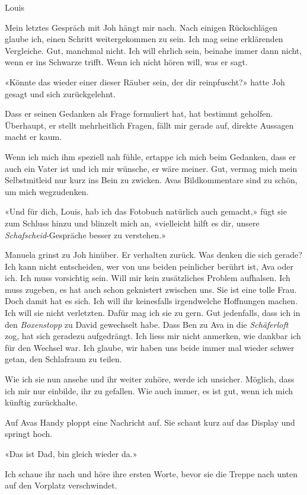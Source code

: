 Louis

Mein letztes Gespräch mit Joh hängt mir nach. Nach einigen Rückschlägen
glaube ich, einen Schritt weitergekommen zu sein. Ich mag seine
erklärenden Vergleiche. Gut, manchmal nicht. Ich will ehrlich sein,
beinahe immer dann nicht, wenn er ins Schwarze trifft. Wenn ich nicht
hören will, was er sagt.

«Könnte das wieder einer dieser Räuber sein, der dir reinpfuscht?» hatte
Joh gesagt und sich zurückgelehnt.

Dass er seinen Gedanken als Frage formuliert hat, hat bestimmt geholfen.
Überhaupt, er stellt mehrheitlich Fragen, fällt mir gerade auf, direkte
Aussagen macht er kaum.

Wenn ich mich ihm speziell nah fühle, ertappe ich mich beim Gedanken,
dass er auch ein Vater ist und ich mir wünsche, er wäre meiner. Gut,
vermag mich mein Selbstmitleid nur kurz ins Bein zu zwicken. Avas
Bildkommentare sind zu schön, um mich wegzudenken.

«Und für dich, Louis, hab ich das Fotobuch natürlich auch gemacht,» fügt
sie zum Schluss hinzu und blinzelt mich an, «vielleicht hilft es dir,
unsere \emph{Schafscheid}-Gespräche besser zu verstehen.»

Manuela grinst zu Joh hinüber. Er verhalten zurück. Was denken die sich
gerade? Ich kann nicht entscheiden, wer von uns beiden peinlicher
berührt ist, Ava oder ich. Ich muss vorsichtig sein. Will mir kein
zusätzliches Problem aufhalsen. Ich muss zugeben, es hat auch schon
geknistert zwischen uns. Sie ist eine tolle Frau. Doch damit hat es
sich. Ich will ihr keinesfalls irgendwelche Hoffnungen machen. Ich will
sie nicht verletzten. Dafür mag ich sie zu gern. Gut jedenfalls, dass
ich in den \emph{Boxenstopp} zu David gewechselt habe. Dass Ben zu Ava
in die \emph{Schäferloft} zog, hat sich geradezu aufgedrängt. Ich liess
mir nicht anmerken, wie dankbar ich für den Wechsel war. Ich glaube, wir
haben uns beide immer mal wieder schwer getan, den Schlafraum zu teilen.

Wie ich sie nun ansehe und ihr weiter zuhöre, werde ich unsicher.
Möglich, dass ich mir nur einbilde, ihr zu gefallen. Wie auch immer, es
ist gut, wenn ich mich künftig zurückhalte.

Auf Avas Handy ploppt eine Nachricht auf. Sie schaut kurz auf das
Display und springt hoch.

«Das ist Dad, bin gleich wieder da.»

Ich schaue ihr nach und höre ihre ersten Worte, bevor sie die Treppe
nach unten auf den Vorplatz verschwindet.

